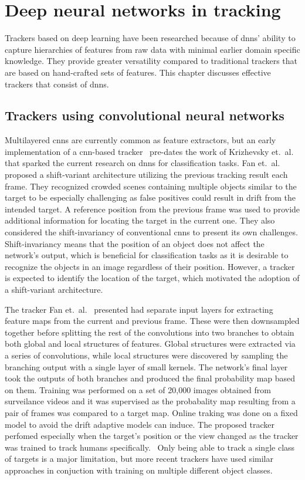 \section{Deep neural networks in tracking}
Trackers based on deep learning have been researched because of \ac{dnn}s' ability
to capture hierarchies of features from raw data with minimal earlier domain specific
knowledge. They provide greater versatility compared to traditional trackers that are 
based on hand-crafted sets of features. This chapter discusses effective trackers
that consist of \ac{dnn}s.

\subsection{Trackers using convolutional neural networks}

Multilayered \ac{cnn}s are currently common as feature extractors, but an early
implementation of a \ac{cnn}-based tracker~\cite{HUMAN_CNN} pre-dates the work of
Krizhevsky et.~al.~\cite{NIPS_IMAGENET} that sparked the current research on \ac{dnn}s
for classification tasks. Fan et.~al.~\cite{HUMAN_CNN} proposed a shift-variant architecture
utilizing the previous tracking result each frame. They recognized crowded scenes
containing multiple objects similar to the target to be especially challenging as false
positives could result in drift from the intended target. A reference position from the
previous frame was used to provide additional information for locating the target in the
current one. They also considered the shift-invariancy of conventional \ac{cnn}s to
present its own challenges. Shift-invariancy means that the position of an object does
not affect the network's output, which is beneficial for classification tasks as it is
desirable to recognize the objects in an image regardless of their position. However, a
tracker is expected to identify the location of the target, which motivated the adoption
of a shift-variant architecture.~\cite{HUMAN_CNN}

The tracker Fan et.~al.~\cite{HUMAN_CNN} presented had separate input layers for
extracting feature maps from the current and previous frame. These were then downsampled
together before splitting the rest of the convolutions into two branches to obtain both
global and local structures of features. Global structures were extracted via a series
of convolutions, while local structures were discovered by sampling the branching output
with a single layer of small kernels. The network's final layer took the outputs of both
branches and produced the final probability map based on them. Training was performed
on a set of 20,000 images obtained from surveilance videos and it was supervised as
the probabality map resulting from a pair of frames was compared to a target map. Online
traking was done on a fixed model to avoid the drift adaptive models can induce. The proposed
tracker perfomed especially when the target's position or the view changed as the tracker
was trained to track humans specifically.~\cite{HUMAN_CNN} Only being able to track a
single class of targets is a major limitation, but more recent trackers have used similar
approaches in conjuction with training on multiple different object classes.

